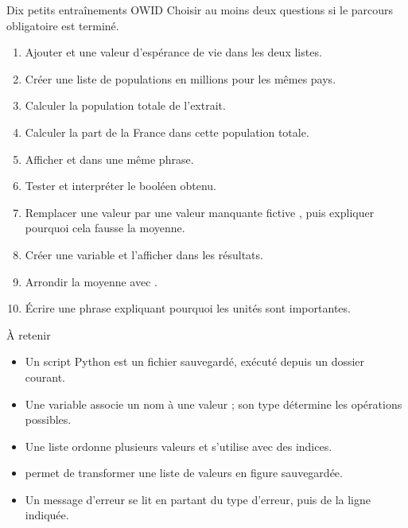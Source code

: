 \documentclass[11pt,a4paper]{article}
\begin{document}
\begin{extensionexercise}{Dix petits entraînements OWID}
Choisir au moins deux questions si le parcours obligatoire est terminé.
\begin{enumerate}
  \item Ajouter  et une valeur d'espérance de vie dans les deux listes.
  \item Créer une liste de populations en millions pour les mêmes pays.
  \item Calculer la population totale de l'extrait.
  \item Calculer la part de la France dans cette population totale.
  \item Afficher  et  dans une même phrase.
  \item Tester  et interpréter le booléen obtenu.
  \item Remplacer une valeur par une valeur manquante fictive , puis expliquer pourquoi cela fausse la moyenne.
  \item Créer une variable  et l'afficher dans les résultats.
  \item Arrondir la moyenne avec .
  \item Écrire une phrase expliquant pourquoi les unités sont importantes.
\end{enumerate}
\end{extensionexercise}

\begin{takeawaybox}{À retenir}
\begin{itemize}
  \item Un script Python est un fichier sauvegardé, exécuté depuis un dossier courant.
  \item Une variable associe un nom à une valeur ; son type détermine les opérations possibles.
  \item Une liste ordonne plusieurs valeurs et s'utilise avec des indices.
  \item {} permet de transformer une liste de valeurs en figure sauvegardée.
  \item Un message d'erreur se lit en partant du type d'erreur, puis de la ligne indiquée.
\end{itemize}
\end{takeawaybox}
\end{document}
